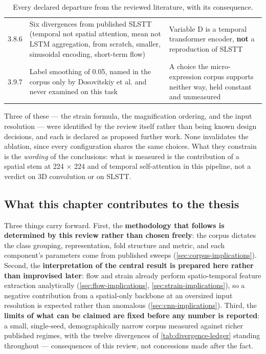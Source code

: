 \begin{table}[htbp]
\begin{tabular}{@{}p{0.85cm} p{6.0cm} p{6.6cm}@{}}
		3.8.6 & Six divergences from published SLSTT (temporal not spatial attention, mean not LSTM aggregation, from scratch, smaller, sinusoidal encoding, short-term flow) & Variable D is a temporal transformer encoder, \textbf{not} a reproduction of SLSTT \\
		3.9.7 & Label smoothing of 0.05, named in the corpus only by Dosovitskiy et al. and never examined on this task & A choice the micro-expression corpus supports neither way, held constant and unmeasured \\
		\hline
	\end{tabular}
	\caption[Every declared departure from the reviewed literature]{Every declared departure from the reviewed literature, with its consequence.}
	\label{tab:divergence-ledger}
\end{table}

Three of these --- the strain formula, the magnification ordering, and the input resolution --- were identified by the review itself rather than being known design decisions, and each is declared as proposed further work. None invalidates the ablation, since every configuration shares the same choices. What they constrain is the \textit{wording} of the conclusions: what is measured is the contribution of a spatial stem at 224 $\times$ 224 and of temporal self-attention in this pipeline, not a verdict on 3D convolution or on SLSTT.

\subsection{What this chapter contributes to the thesis}
\label{sec:ch3-contribution}

Three things carry forward. First, the \textbf{methodology that follows is determined by this review rather than chosen freely}: the corpus dictates the class grouping, representation, fold structure and metric, and each component's parameters come from published sweeps (\autoref{sec:corpus-implications}). Second, the \textbf{interpretation of the central result is prepared here rather than improvised later}: flow and strain already perform spatio-temporal feature extraction analytically (\autoref{sec:flow-implications}, \autoref{sec:strain-implications}), so a negative contribution from a spatial-only backbone at an oversized input resolution is expected rather than anomalous (\autoref{sec:cnn-implications}). Third, the \textbf{limits of what can be claimed are fixed before any number is reported}: a small, single-seed, demographically narrow corpus measured against richer published regimes, with the twelve divergences of \autoref{tab:divergence-ledger} standing throughout --- consequences of this review, not concessions made after the fact.
